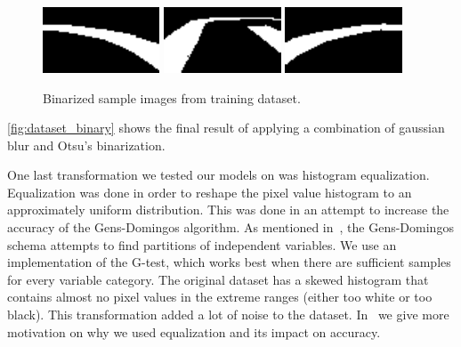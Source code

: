 \begin{figure}[h]
  \centering\includegraphics[width=0.31\textwidth]{imgs/binary_left.png}
  \includegraphics[width=0.31\textwidth]{imgs/binary_up.png}
  \includegraphics[width=0.31\textwidth]{imgs/binary_right.png}
  \caption{Binarized sample images from training dataset.\label{fig:dataset_binary}}
\end{figure}

\autoref{fig:dataset_binary} shows the final result of applying a combination of gaussian blur and
Otsu's binarization.

One last transformation we tested our models on was histogram equalization. Equalization was done
in order to reshape the pixel value histogram to an approximately uniform distribution. This was
done in an attempt to increase the accuracy of the Gens-Domingos algorithm. As mentioned
in~, the Gens-Domingos schema attempts to find partitions of independent
variables. We use an implementation of the G-test, which works best when there are sufficient
samples for every variable category. The original dataset has a skewed histogram that contains
almost no pixel values in the extreme ranges (either too white or too black). This transformation
added a lot of noise to the dataset. In~ we give more motivation on why we
used equalization and its impact on accuracy.

